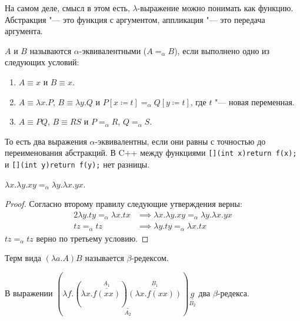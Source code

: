 На самом деле, смысл в этом есть, $\lambda$-выражение можно понимать как функцию.
Абстракция "--- это функция с аргументом, аппликация "--- это передача аргумента.

\begin{definition}
    $A$ и $B$ называются $\alpha$-эквивалентными ($A=_{\alpha}B$), если выполнено одно из следующих условий:
    \begin{enumerate}
        \item $A\equiv{}x$ и $B\equiv{}x$.
        \item $A\equiv{}\lambda{}x.P$, $B\equiv{}\lambda{}y.Q$ и $P [x\coloneqq{}t] =_{\alpha}Q [y\coloneqq{}t]$, где $t$ "--- новая переменная.
        \item $A\equiv{}PQ$, $B\equiv{}RS$ и $P=_{\alpha}R$, $Q=_{\alpha}S$.
    \end{enumerate}
\end{definition}

То есть два выражения $\alpha$-эквивалентны, если они равны с точностью до переименования абстракций.
В C++ между функциями \texttt{[](int x){return f(x);}} и \texttt{[](int y){return f(y);}} нет разницы.

\begin{example}
    $\lambda{}x.\lambda{}y.xy=_{\alpha}\lambda{}y.\lambda{}x.yx$.
    \begin{proof} Согласно второму правилу следующие утверждения верны:
        \begin{alignat*}{2}
            \lambda{}y.ty=_{\alpha}\lambda{}x.tx &\implies \lambda{}x.\lambda{}y.xy=_{\alpha}\lambda{}y.\lambda{}x.yx \\
            tz=_{\alpha}tz &\implies \lambda{}y.ty=_{\alpha}\lambda{}x.tx
        \end{alignat*}%
        $tz=_{\alpha}tz$ верно по третьему условию.
    \end{proof}
\end{example}

\begin{definition}
    Терм вида $\left(\lambda{}a.A\right)B$ называется $\beta$-редексом.
\end{definition}

\begin{example}
    В выражении
    $
        (
            \lambda{}f.
                \underset{A_2}{\underline{
                    (\lambda{}x.\overset{A_1}{\overline{f(xx)}})
                    \overset{B_1}{\overline{(\lambda{}x.f(xx))}}
                }}
        )\underset{B_2}{\underline{g}}
    $ два $\beta$-редекса.
\end{example}

